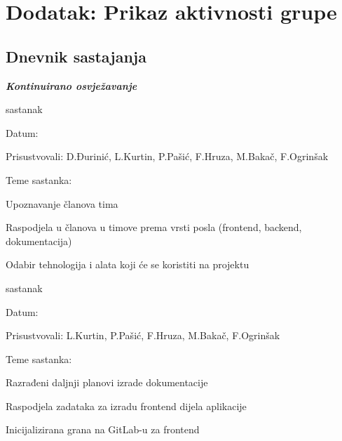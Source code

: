 \chapter*{Dodatak: Prikaz aktivnosti grupe}
		
		\section*{Dnevnik sastajanja}
		
		\textbf{\textit{Kontinuirano osvježavanje}}\\
		
		
		\begin{packed_enum}
			\item  sastanak
			
			
			
			\item[] \begin{packed_item}
				\item Datum: \prvisastanak
				 
					
				\item Prisustvovali: D.Đurinić, L.Kurtin, P.Pašić, F.Hruza, M.Bakač, F.Ogrinšak
				\item Teme sastanka:
				
				\begin{packed_item}
					\item  Upoznavanje članova tima
					\item  Raspodjela u članova u timove prema vrsti posla (frontend, backend, dokumentacija)
					\item  Odabir tehnologija i alata koji će se koristiti na projektu
				\end{packed_item}
			\end{packed_item}
			
			\item  sastanak
			\item[] \begin{packed_item}
				\item Datum: \drugisastanak
				\item Prisustvovali: L.Kurtin, P.Pašić, F.Hruza, M.Bakač, F.Ogrinšak
				\item Teme sastanka:
				\begin{packed_item}
					\item  Razrađeni daljnji planovi izrade dokumentacije
					\item  Raspodjela zadataka za izradu frontend dijela aplikacije
					\item  Inicijalizirana grana na GitLab-u za frontend
				\end{packed_item}
			\end{packed_item}
		

\end{packed_enum}
